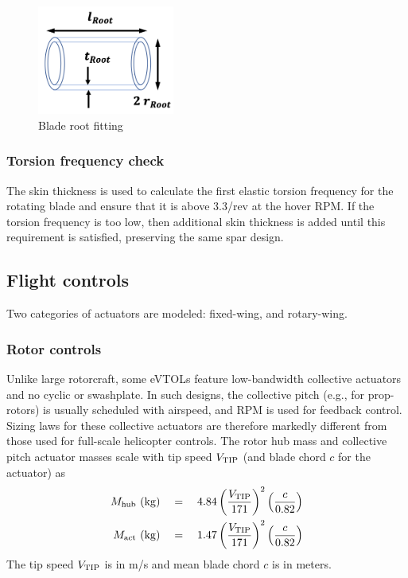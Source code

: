 \begin{figure}
\begin{center}
\includegraphics[width=0.4\textwidth]{images/root_fitting.png}
\vspace{-0.1cm}
\caption{Blade root fitting}
\label{fig:root_fitting}
\end{center}
\end{figure}

\subsubsection{Torsion frequency check}
The skin thickness is used to calculate the first elastic torsion frequency for the rotating blade and ensure that it is above 3.3/rev at the hover RPM. If the torsion frequency is too low, then additional skin thickness is added until this requirement is satisfied, preserving the same spar design.

\subsection{Flight controls}
\noindent Two categories of actuators are modeled: fixed-wing, and rotary-wing. 
\subsubsection{Rotor controls}
Unlike large rotorcraft, some eVTOLs feature low-bandwidth collective actuators and no cyclic or swashplate. In such designs, the collective pitch (e.g., for prop-rotors) is usually scheduled with airspeed, and RPM is used for feedback control. Sizing laws for these collective actuators are therefore markedly different from those used for full-scale helicopter controls. The rotor hub mass and collective pitch actuator masses scale with tip speed $V_{\rm TIP}$ (and blade chord $c$ for the actuator) as 
\begin{align}
M_{\rm hub} \textrm{ } ({\rm kg})\quad &= \quad 4.84 \left(\frac{V_{\rm TIP}}{171}\right)^2 \left(\frac{c}{0.82}\right) \\
M_{\rm act} \textrm{ } ({\rm kg})\quad &= \quad 1.47 \left(\frac{V_{\rm TIP}}{171}\right)^2 \left(\frac{c}{0.82}\right)
\end{align}
The tip speed $V_{\rm TIP}$ is in m/s and mean blade chord $c$ is in meters. 
